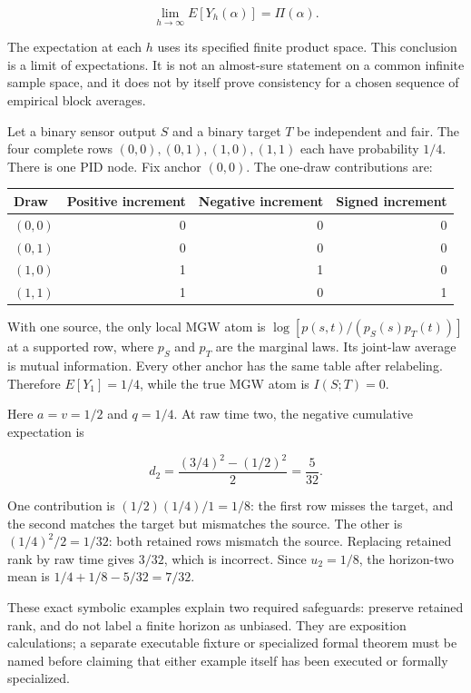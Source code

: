 \[
\lim_{h\to\infty} E[Y_h(\alpha)]=\Pi(\alpha).
\]

The expectation at each \(h\) uses its specified finite product space. This conclusion is a limit of expectations. It is not an almost-sure statement on a common infinite sample space, and it does not by itself prove consistency for a chosen sequence of empirical block averages.

\clearpage
{}\label{a-sensor-with-no-target-information-can-give-a-positive-short-prefix-mean}

Let a binary sensor output \(S\) and a binary target \(T\) be independent and fair. The four complete rows \((0,0),(0,1),(1,0),(1,1)\) each have probability \(1/4\). There is one PID node. Fix anchor \((0,0)\). The one-draw contributions are:

{\def\LTcaptype{none} %
\begin{longtable}[]{@{}lrrr@{}}
\toprule\noalign{}
Draw & Positive increment & Negative increment & Signed increment \\
\midrule\noalign{}
\endhead
\bottomrule\noalign{}
\endlastfoot
\((0,0)\) & 0 & 0 & 0 \\
\((0,1)\) & 0 & 0 & 0 \\
\((1,0)\) & 1 & 1 & 0 \\
\((1,1)\) & 1 & 0 & 1 \\
\end{longtable}
}

With one source, the only local MGW atom is \(\log[p(s,t)/(p_S(s)p_T(t))]\) at a supported row, where \(p_S\) and \(p_T\) are the marginal laws. Its joint-law average is mutual information. Every other anchor has the same table after relabeling. Therefore \(E[Y_1]=1/4\), while the true MGW atom is \(I(S;T)=0\).

Here \(a=v=1/2\) and \(q=1/4\). At raw time two, the negative cumulative expectation is

\[
d_2=\frac{(3/4)^2-(1/2)^2}{2}=\frac5{32}.
\]

One contribution is \((1/2)(1/4)/1=1/8\): the first row misses the target, and the second matches the target but mismatches the source. The other is \((1/4)^2/2=1/32\): both retained rows mismatch the source. Replacing retained rank by raw time gives \(3/32\), which is incorrect. Since \(u_2=1/8\), the horizon-two mean is \(1/4+1/8-5/32=7/32\).

These exact symbolic examples explain two required safeguards: preserve retained rank, and do not label a finite horizon as unbiased. They are exposition calculations; a separate executable fixture or specialized formal theorem must be named before claiming that either example itself has been executed or formally specialized.

